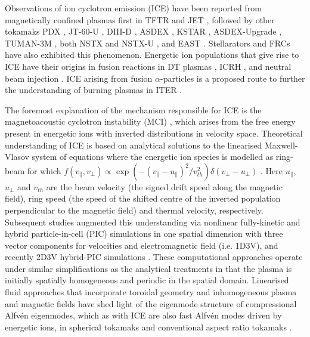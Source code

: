 \documentclass[12pt]{iopart}
\begin{document}
Observations of ion cyclotron emission (ICE) have been reported from
magnetically confined plasmas first in TFTR \cite{Cauffman1995,Dendy1995}
and JET \cite{Cottrell1988,Cottrell1993,Dendy1995}, followed by other tokamaks
PDX \cite{Heidbrink1994}, JT-60-U \cite{Ichimura2008}, DIII-D \cite{Heidbrink2011},
ASDEX \cite{DInca2014}, KSTAR \cite{Chapman2017,Chapman2018},
ASDEX-Upgrade \cite{Ochoukov2018},
TUMAN-3M \cite{Askinazi2018}, both NSTX and NSTX-U \cite{Fredrickson2019},
and EAST \cite{Liu2020}. Stellarators \cite{Saito2013} and
FRCs \cite{Nicks2020} have also exhibited this phenomenon. Energetic ion
populations that give rise to ICE have their origins in fusion
reactions in DT plasmas \cite{Cottrell2000, Cauffman1995},
ICRH \cite{Cottrell2000}, and neutral beam injection \cite{Ochoukov2018}. ICE
arising from fusion $\alpha$-particles is a proposed route to further
the understanding of burning plasmas in ITER \cite{Dendy2015,McClements2015}. 

The foremost explanation of the mechanism responsible for ICE is the
magnetoacoustic cyclotron instability (MCI) \cite{Belikov1976}, which arises from
the free energy present in energetic ions with inverted distributions in
velocity space. Theoretical understanding of ICE is based on analytical
solutions to the linearised Maxwell-Vlasov system of equations \cite{Stix} where
the energetic ion species is modelled as ring-beam for which $f(v_\parallel,
v_\perp) \propto \exp(-(v_\parallel-u_\parallel)^2/ v_{th}^2)\delta(v_\perp -
u_\bot)$ \cite{Dendy1994, McClements1996}. Here $u_\parallel$, $u_\perp$ and
$v_{th}$ are the beam velocity (the signed drift speed along the magnetic
field), ring speed (the speed of the shifted centre of the inverted population
perpendicular to the magnetic field)
and thermal velocity, respectively. Subsequent studies augmented this
understanding via nonlinear fully-kinetic \cite{Cook2013,Chapman2017} and
hybrid \cite{Carbajal2014,Reman2019} particle-in-cell (PIC) simulations in one
spatial dimension with three vector components for velocities and electromagnetic
field (i.e. 1D3V), and recently 2D3V hybrid-PIC simulations \cite{Carbajal2021}. These
computational approaches operate under similar simplifications as the analytical
treatments in that the plasma is initially spatially homogeneous and periodic
in the spatial domain.
Linearised fluid approaches that incorporate toroidal geometry and
inhomogeneous plasma and magnetic fields have shed light of the eigenmode
structure of compressional Alfv{\'e}n eigenmodes, which as with ICE are also fast
Alfv{\'e}n modes driven by energetic ions, in spherical
tokamaks \cite{Sharapov2014, Gorelenkov2016} and conventional aspect ratio
tokamaks \cite{Kolesnichenko2000, Fulop2000, Heidbrink2006}.
\end{document}
